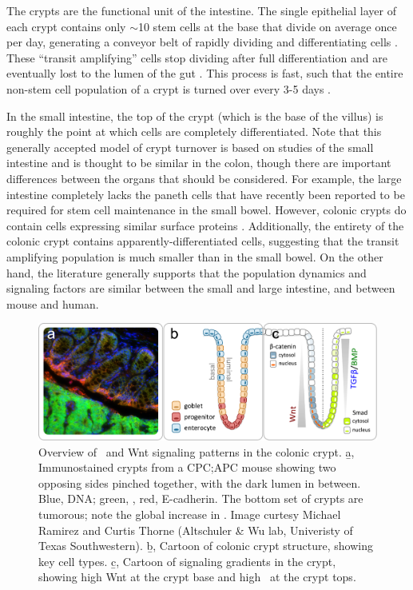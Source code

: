 The crypts are the functional unit of the intestine. The single epithelial layer
of each crypt contains only
$\sim$10 stem cells at the base that divide on average once per day,
generating a conveyor belt of rapidly dividing and differentiating cells
\cite{Snippert2010} . These ``transit amplifying'' cells stop dividing
after full differentiation and are eventually lost to the lumen of the gut
\cite{Eisenhoffer2012}. This process is fast, such that the entire non-stem
cell population of a crypt is turned over every 3-5 days \cite{Buske2011}.


In the small intestine, the top of the crypt (which is the base of
the villus) is roughly the point at which cells are completely differentiated.
Note that this generally accepted model of crypt turnover
is based on studies of the small intestine and is thought to be similar in
the colon, though there are important
differences between the organs that should be considered.
For example, the large intestine completely lacks the paneth cells that have
recently been reported to be required for stem cell maintenance in the small
bowel. However, colonic crypts do contain cells
expressing similar surface proteins \cite{Sato2011b}.
Additionally, the entirety of the colonic crypt contains apparently-differentiated
cells, suggesting that the transit amplifying population
is much smaller than in the small bowel.
On the other hand, the literature generally supports that the population
dynamics and signaling factors are similar between the small and large
intestine, and between mouse and human.


	\begin{figure}%
	\centering
	\includegraphics[width=6in]{FIGS/pathways/crypt.pdf}
	{\singlespacing 
	\caption[Expression patterns of Wnt and \tgfbsf\ in colonic crypts]
            { Overview of \tgfbsf\ and Wnt signaling patterns
            in the colonic crypt. \b{a}, Immunostained crypts
            from a CPC;APC mouse \cite{Hinoi2007} showing two opposing sides pinched
            together, with the dark lumen in between. Blue, DNA; green,
            \bcat, red, E-cadherin. The bottom set of crypts are tumorous;
            note the global increase in \bcat. Image curtesy Michael
            Ramirez and Curtis Thorne (Altschuler \& Wu lab,
            Univeristy of Texas Southwestern).
            \b{b}, Cartoon of colonic crypt
            structure, showing key cell types. \b{c}, Cartoon of
            signaling gradients in the crypt, showing high Wnt
            at the crypt base and high \tgfbsf\ at the crypt tops.}
	\label{fig:pathways:crypt}}
	\end{figure}



